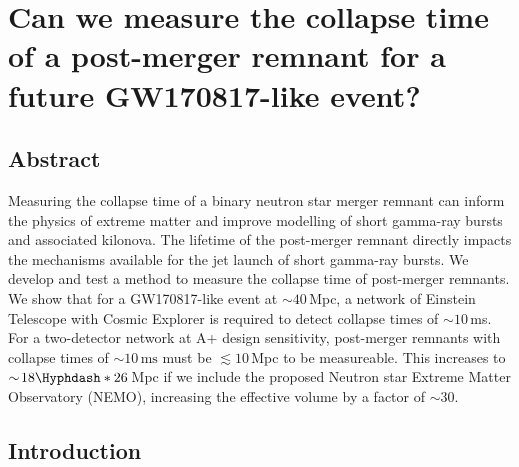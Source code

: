\documentclass[../Thesis.tex]{subfiles}
\begin{document}
\begingroup
\clearpage%
\let\clearpage\relax%
\vspace*{-2cm}%



\chapter{Can we measure the collapse time of a post-merger remnant for a future GW170817-like event?}
\label{chapter:CollapseTime}
\endgroup






\section*{Abstract}

    
    Measuring the collapse time of a binary neutron star merger remnant can inform the physics of extreme matter and improve modelling of short gamma-ray bursts and associated kilonova.
    The lifetime of the post-merger remnant directly impacts the mechanisms available for the jet launch of short gamma-ray bursts.
    We develop and test a method to measure the collapse time of post-merger remnants.
    We show that for a GW170817-like event at $\sim\!40$\,Mpc, a network of Einstein Telescope with Cosmic Explorer is required to detect collapse times of $\sim\!10$\,ms.
    For a two-detector network at A+ design sensitivity, post-merger remnants with collapse times of $\sim\!10\,\mathrm{ms}$ must be $\lesssim 10$\,Mpc to be measureable.
    This increases to $\sim\!18\Hyphdash*26$\,Mpc if we include the proposed Neutron star Extreme Matter Observatory (NEMO), increasing the effective volume by a factor of $\sim\!30$.


    

    \vspace{-0.25cm}
    \section{Introduction}
    \label{sec:introduction3}
\end{document}
